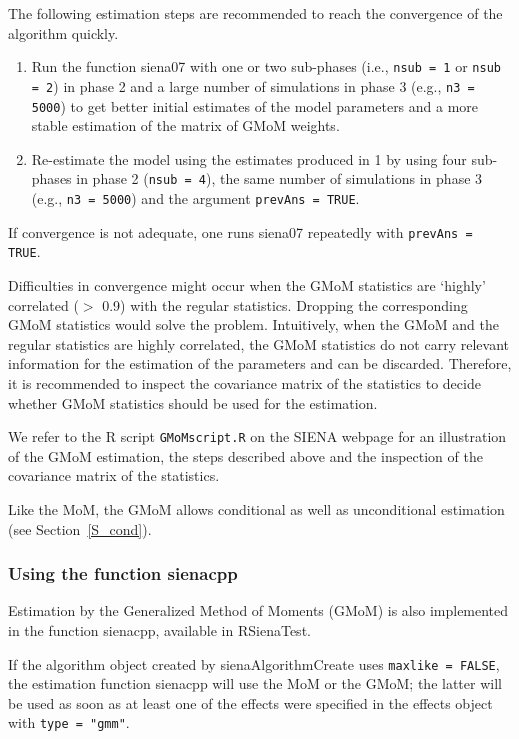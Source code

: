 \documentclass[a4paper,fleqn,11pt]{article}
\newcommand{\+}{\, + \,}
\newcommand{\sfn}[1]{\textsf{#1}}
\newcommand{\R}{{\sf R }}
\newcommand{\SI}{{\sf SIENA }}
\begin{document}
The following estimation steps are recommended to reach the convergence of the algorithm quickly.
\begin{enumerate}
	\item  Run the function \textsf{siena07} with one or two sub-phases (i.e.,
\texttt{nsub = 1} or \texttt{nsub = 2}) in phase 2 and a large number of simulations in phase 3
(e.g., \texttt{n3 = 5000}) to get better initial estimates of the model parameters and a
more stable estimation of the matrix of GMoM weights.
 \item Re-estimate the model using the estimates produced in 1 by using four sub-phases in phase 2
(\texttt{nsub = 4}), the same number of simulations in phase 3 (e.g., \texttt{n3 = 5000}) and the
argument \texttt{prevAns = TRUE}.
\end{enumerate}
If convergence is not adequate, one runs \textsf{siena07} repeatedly with \texttt{prevAns = TRUE}.

Difficulties in convergence might occur when the GMoM statistics are `highly' correlated ($>$ 0.9) with the regular statistics. Dropping the corresponding GMoM statistics would solve the problem. Intuitively, when the GMoM and the regular statistics are highly correlated, the GMoM statistics do not carry relevant information
for the estimation of the parameters and can be discarded. Therefore, it is recommended to inspect the covariance matrix of the statistics to decide whether GMoM statistics should be used for the estimation.

We refer to  the  \R script \texttt{GMoMscript.R} on the \SI webpage for an illustration of the GMoM estimation, the steps described above and the inspection of the covariance matrix of the statistics.

Like the MoM, the GMoM allows conditional as well as unconditional estimation (see Section~\ref{S_cond}).


\subsubsection{Using the function \sfn{sienacpp}}
\label{S_GMoM_sienacpp}

Estimation by the Generalized Method of Moments (GMoM) is also implemented
in the function \sfn{sienacpp}, available in \sfn{RSienaTest}.

If the algorithm object created by \sfn{sienaAlgorithmCreate}
uses \texttt{maxlike = FALSE}, the estimation function \sfn{sienacpp}
will use the MoM or the GMoM; the latter will be used as soon as
at least one of the effects were specified in the effects object with
\texttt{type = "gmm"}.
\end{document}
